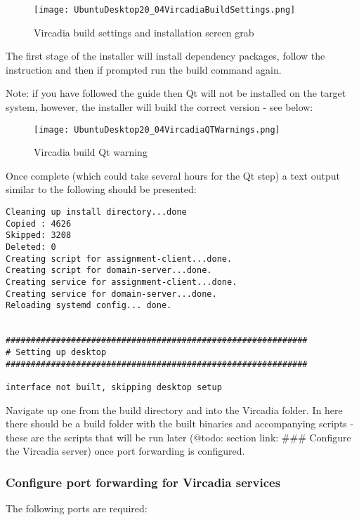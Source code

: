 \begin{figure}
\centering
\texttt{[image: UbuntuDesktop20\_04VircadiaBuildSettings.png]}
\caption{Vircadia build settings and installation screen grab}
\end{figure}

The first stage of the installer will install dependency packages,
follow the instruction and then if prompted run the build command again.

Note: if you have followed the guide then Qt will not be installed on
the target system, however, the installer will build the correct version
- see below:

\begin{figure}
\centering
\texttt{[image: UbuntuDesktop20\_04VircadiaQTWarnings.png]}
\caption{Vircadia build Qt warning}
\end{figure}

Once complete (which could take several hours for the Qt step) a text
output similar to the following should be presented:

\begin{verbatim}
Cleaning up install directory...done
Copied : 4626
Skipped: 3208
Deleted: 0
Creating script for assignment-client...done.
Creating script for domain-server...done.
Creating service for assignment-client...done.
Creating service for domain-server...done.
Reloading systemd config... done.


############################################################
# Setting up desktop
############################################################

interface not built, skipping desktop setup
\end{verbatim}

Navigate up one from the build directory and into the Vircadia folder.
In here there should be a build folder with the built binaries and
accompanying scripts - these are the scripts that will be run later
(@todo: section link: \#\#\# Configure the Vircadia server) once port
forwarding is configured.

\hypertarget{configure-port-forwarding-for-vircadia-services}{%
\subsubsection{Configure port forwarding for Vircadia
services}\label{configure-port-forwarding-for-vircadia-services}}

The following ports are required:

